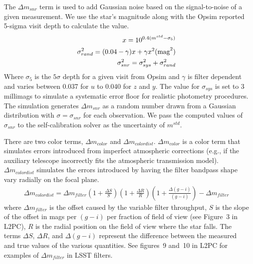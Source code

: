\documentclass[12pt,preprint]{aastex}
\begin{document}
The $\Delta m_{snr}$ term is used to add Gaussian noise based on the signal-to-noise of a given measurement.  We use the star's magnitude along with the Opsim reported 5-sigma visit depth to calculate the value. 
\begin{eqnarray}
x = 10^{0.4(m^{std} - \sigma_5)} \\
\sigma^2_{rand} = (0.04-\gamma)x+\gamma x^2 \rm{ (mag}^2) \\
\sigma^2_{snr} = \sigma^2_{sys}+\sigma^2_{rand}
\end{eqnarray}
Where $\sigma_5$ is the $5\sigma$ depth for a given visit from Opsim and $\gamma$ is filter dependent and varies between 0.037 for $u$ to 0.040 for $z$ and $y$.  The value for $\sigma_{sys}$ is set to 3 millimags to simulate a systematic error floor for realistic photometry procedures.  The simulation generates $\Delta m_{snr}$ as a random number drawn from a Gaussian distribution with $\sigma=\sigma_{snr}$ for each observation.  We pass the computed values of $\sigma_{snr}$ to the self-calibration solver as the uncertainty of $m^{std}$.


There are two color terms, $\Delta m_{color}$ and $\Delta m_{colordist}$.  $\Delta m_{color}$ is a color term that simulates errors introduced from imperfect atmospheric corrections (e.g., if the auxiliary telescope incorrectly fits the atmospheric transmission model).  $\Delta m_{colordist}$ simulates the errors introduced by having the filter bandpass shape vary radially on the focal plane.  
\begin{eqnarray}
\Delta m_{colordist} = \Delta m_{filter} (1+\frac{\Delta S}{S})(1+\frac{\Delta R}{R})(1+\frac{\Delta (g-i)}{(g-i)})-\Delta m_{filter}
\end{eqnarray}
where $\Delta m_{filter}$ is the offset caused by the variable filter throughput, $S$ is the slope of the offset in mags per $(g-i)$ per fraction of field of view (see Figure~3 in L2PC), $R$ is the radial position on the field of view where the star falls.  The terms $\Delta S$, $\Delta R$, and $\Delta (g-i)$ represent the difference between the measured and true values of the various quantities.  See figures~9 and~10 in L2PC for examples of $\Delta m_{filter}$ in LSST filters.
\end{document}
